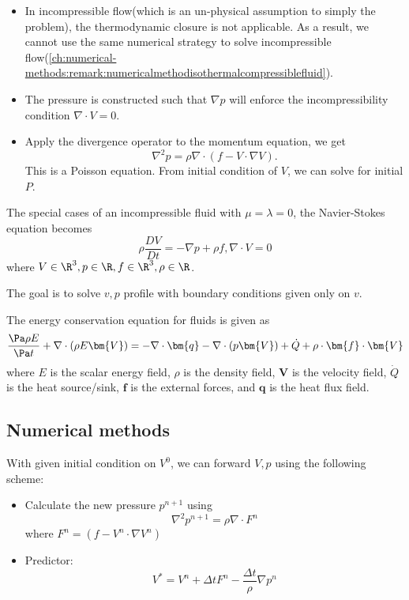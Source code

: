 \begin{refsection}
\begin{remark}\cite[197]{zikanov2010essential}
	\begin{itemize}
		\item In incompressible flow(which is an un-physical assumption to simply the problem), the thermodynamic closure is not applicable. As a result, we cannot use the same numerical strategy to solve incompressible flow(\autoref{ch:numerical-methods:remark:numericalmethodisothermalcompressiblefluid}).
		\item The pressure is constructed such that $\nabla p$ will enforce the incompressibility condition $\nabla \cdot V = 0$.
		\item Apply the divergence operator to the momentum equation, we get
		$$\nabla^2 p = \rho\nabla \cdot (f - V\cdot \nabla V).$$
		This is a Poisson equation. From initial condition of $V$, we can solve for initial $P$. 
	\end{itemize}
\end{remark}



\begin{definition}\cite[19]{zikanov2010essential}
	The special cases of an incompressible fluid with  $\mu = \lambda = 0$, the Navier-Stokes equation becomes
	$$\rho \frac{DV}{Dt} = -\nabla p + \rho f, \nabla \cdot V = 0$$
	where $V\in \R^3, p\in \R, f\in \R^3,\rho\in \R$.
	
	The goal is to solve $v,p$ profile with boundary conditions given only on $v$.
\end{definition}


\begin{theorem}\cite[25]{zikanov2010essential}
	The energy conservation equation for fluids is given as
	$$\frac{\Pa \rho E}{\Pa t} + \nabla \cdot (\rho E\bm{V}) = -\nabla \cdot \bm{q} - \nabla \cdot (p \bm{V}) + \dot{Q} + \rho\cdot \bm{f}\cdot \bm{V}$$
	where $E$ is the scalar energy field, $\rho$ is the density field, $\bm{V}$ is the velocity field, $\dot{Q}$ is the heat source/sink, $\bm{f}$ is the external forces, and $\bm{q}$ is the heat flux field. 
\end{theorem}

\subsection{Numerical methods}
\begin{lemma}\cite[209]{zikanov2010essential}\hfill
	With given initial condition on $V^0$, we can forward $V,p$ using the following scheme:
	\begin{itemize}
		\item Calculate the new pressure $p^{n+1}$ using
		$$\nabla^2 p^{n+1} = \rho \nabla \cdot F^n$$
		where $F^n = (f - V^n\cdot \nabla V^n)$
		\item Predictor:
		$$V^* = V^n + \Delta t F^n - \frac{\Delta t}{\rho} \nabla p^n$$
		

\end{itemize}
\end{lemma}
\end{refsection}
